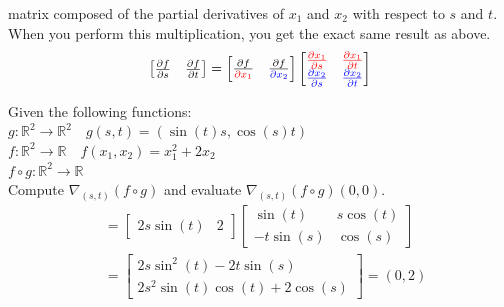 \documentclass{article}
\begin{document}
matrix composed of the partial derivatives of $x_1$ and $x_2$ with respect to
$s$ and $t$. When you perform this multiplication, you get the exact same
result as above.
$$
\begin{bmatrix}
    \frac{\partial{f}}{\partial{s}} & \frac{\partial{f}}{\partial{t}}
\end{bmatrix}=\begin{bmatrix}
    \frac{\partial{f}}{\color{red}\partial{x_1}} &
    \frac{\partial{f}}{\color{blue}\partial{x_2}}
\end{bmatrix}\begin{bmatrix}
    {\color{red}\frac{\partial{x_1}}{\partial{s}}} &
    {\color{red}\frac{\partial{x_1}}{\partial{t}}} \\ 
    {\color{blue}\frac{\partial{x_2}}{\partial{s}}} &
    {\color{blue}\frac{\partial{x_2}}{\partial{t}}}
\end{bmatrix}$$
\newpage
\begin{example}
    Given the following functions:\\
    $g:\mathbb{R}^2\to \mathbb{R}^2\quad g(s,t)=(\sin(t)s, \cos(s)t)$\\ 
    $f:\mathbb{R}^2\to \mathbb{R}\quad f(x_1,x_2)=x_1^2+2x_2$\\ 
    $f\circ g: \mathbb{R}^2\to \mathbb{R}$\\
    Compute $\nabla_{(s,t)}(f\circ g)$ and evaluate $\nabla_{(s,t)}(f\circ g)(0,0)$.
    $$
    \begin{aligned}
        &=\begin{bmatrix}
            2s\sin(t) & 2
        \end{bmatrix}
        \begin{bmatrix}
            \sin(t) & s\cos(t)\\ 
            -t\sin(s) & \cos(s)
        \end{bmatrix} \\ 
        &=\begin{bmatrix}
            2s\sin^2(t)-2t\sin(s) \\ 
            2s^2\sin(t)\cos(t)+2\cos(s)
        \end{bmatrix}=(0,2)
    \end{aligned}
    $$
\end{example}
\end{document}
